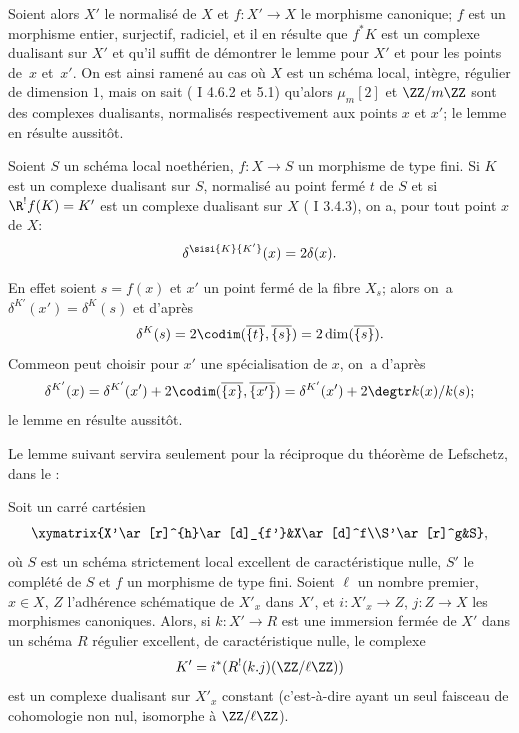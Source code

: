 Soient alors $X'$ le normalis\'e de $X$ et $f:X'\to X$ le morphisme canonique; $f$ est un morphisme entier, surjectif, radiciel, et il en r\'esulte que $f^*K$ est un complexe dualisant sur $X'$ et qu'il suffit de d\'emontrer le lemme pour $X'$ et pour les points  de~$x$ et~$x'$. On est ainsi ramen\'e au cas o\`u $X$ est un sch\'ema local, int\`egre, r\'egulier de dimension $1$, mais on sait (\cf {} I 4.6.2 et 5.1) qu'alors $\mu_m[2]$ et $\ZZ/m\ZZ$ sont des complexes dualisants, normalis\'es respectivement aux points $x$ et $x'$; le lemme en r\'esulte aussit\^{o}t.

\begin{sublemme} \label{XIV.2.3.2} Soient $S$ un sch\'ema local noeth\'erien, $f:X\to S$ un morphisme de type fini. Si $K$ est un complexe dualisant sur $S$, normalis\'e au point ferm\'e $t$ de $S$ et si $\R^!f(K)=K'$ est un complexe dualisant sur $X$ (\cf {} I 3.4.3), on a, pour tout point $x$ de $X$:$$
\delta^{\sisi{K}{{K'}}}(x)=2\delta(x).
$$
\end{sublemme}

En effet soient $s=f(x)$ et $x'$ un point ferm\'e de la fibre $X_s$; alors on~a $\delta^{K'}(x')=\delta^K(s)$ et d'apr\`es 
$$
\delta^K(s)=2\codim(\overline{\{t\}}, \overline{\{s\}})=2\dim(\overline{\{s\}}).
$$
Comme\pageoriginaled on peut choisir pour $x'$ une sp\'ecialisation de $x$, on~a d'apr\`es 
$$
\delta^{K'}(x)=\delta^{K'}(x')+2\codim(\overline{\{x\}}, \overline{\{x'\}})=\delta^{K'}(x')+2\degtr k(x)/k(s);$$
le lemme en r\'esulte aussit\^{o}t.

Le lemme suivant servira seulement pour la r\'eciproque du th\'eor\`eme de Lefschetz, dans le \numero{}:

\begin{sublemme} \label{XIV.2.3.3}
Soit un carr\'e cart\'esien
$$
\xymatrix{X'\ar[r]^{h}\ar[d]_{f'}&X\ar[d]^f\\S'\ar[r]^g&S},
$$
o\`u $S$ est un sch\'ema strictement local excellent de caract\'eristique nulle, $S'$ le compl\'et\'e de $S$ et $f$ un morphisme de type fini. Soient $\ell$ un nombre premier, $x\in X$, $Z$ l'adh\'erence sch\'ematique de $X'_x$ dans $X'$, et $i:X'_x\to Z$, $j:Z\to X$ les morphismes canoniques. Alors, si $k:X'\to R$ est une immersion ferm\'ee de $X'$ dans un sch\'ema $R$ r\'egulier excellent, de caract\'eristique nulle, le complexe
$$K'=i^*(R^!(k.j)(\ZZ/\ell\ZZ))$$
est un complexe dualisant sur $X'_x$ constant (c'est-\`a-dire ayant un seul faisceau de cohomologie non nul, isomorphe \`a $\ZZ/\ell\ZZ$).
\end{sublemme}

